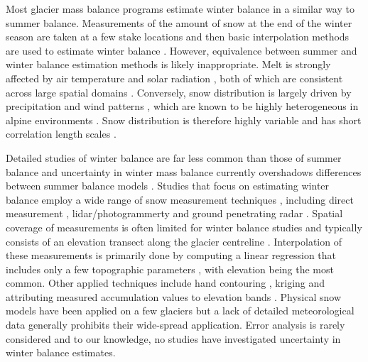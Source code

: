 \documentclass[review,oneside, letterpaper]{igs}
\begin{document}
Most glacier mass balance programs estimate winter balance in a similar way to summer balance. Measurements of the amount of snow at the end of the winter season are taken at a few stake locations and then basic interpolation methods are used to estimate winter balance \citep[e.g.][]{Hock1999, Thibert2008, MacDougall2011, Cullen2017}. However, equivalence between summer and winter balance estimation methods is likely inappropriate. Melt is strongly affected by air temperature and solar radiation \citep[e.g.][]{Hock2005}, both of which are consistent across large spatial domains \citep[e.g.][]{Barry1992}. Conversely, snow distribution is largely driven by precipitation \citep[e.g.][]{Lehning2008} and wind patterns \citep[e.g.][]{Bernhardt2009, Musselman2015}, which are known to be highly heterogeneous in alpine environments \citep[e.g.][]{Barry1992}. Snow distribution is therefore highly variable and has short correlation length scales \citep[e.g.][]{Anderton2004, Egli2011, Grunewald2010, Helbig2017, Lopez2011, Lopez2013, Machguth2006, Marshall2006}. 

Detailed studies of winter balance are far less common than those of summer balance and uncertainty in winter mass balance currently overshadows differences between summer balance models \citep[e.g.][]{Reveillet2016}. Studies that focus on estimating winter balance employ a wide range of snow measurement techniques \citep{Sold2013}, including direct measurement \citep[e.g.][]{Cullen2017}, lidar/photogrammerty \citep[e.g.][]{Sold2013} and ground penetrating radar \citep[e.g.][]{Machguth2006, Gusmeroli2014, McGrath2015}. Spatial coverage of measurements is often limited for winter balance studies and typically consists of an elevation transect along the glacier centreline \citep[e.g.][]{Kaser2003, Machguth2006}. Interpolation of these measurements is primarily done by computing a linear regression that includes only a few topographic parameters \citep[e.g.][]{MacDougall2011}, with elevation being the most common. Other applied techniques include hand contouring \citep[e.g.][]{Tangborn1975}, kriging \citep[e.g.][]{Hock1999} and attributing measured accumulation values to elevation bands \citep[e.g.][]{Thibert2008}. Physical snow models have been applied on a few glaciers \citep[e.g.][]{Mott2008, Dadic2010} but a lack of detailed meteorological data generally prohibits their wide-spread application. Error analysis is rarely considered and to our knowledge, no studies have investigated uncertainty in winter balance estimates. 
\end{document}
